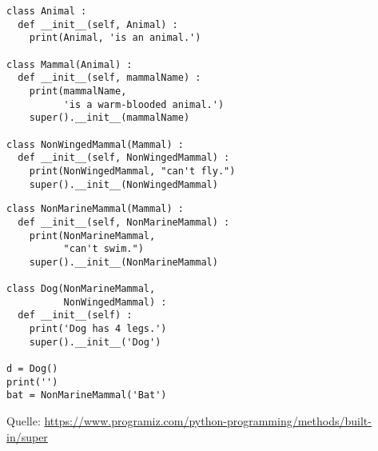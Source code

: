 \begin{frame}[fragile]
%
\begin{tcbraster}[raster columns=2,
                  raster equal height,
                  nobeforeafter,
                  raster column skip=0.5cm]
\begin{codebox}
\begin{verbatim}
class Animal :
  def __init__(self, Animal) :
    print(Animal, 'is an animal.')
    
class Mammal(Animal) :
  def __init__(self, mammalName) :
    print(mammalName, 
          'is a warm-blooded animal.')
    super().__init__(mammalName)

class NonWingedMammal(Mammal) :
  def __init__(self, NonWingedMammal) :
    print(NonWingedMammal, "can't fly.")
    super().__init__(NonWingedMammal)
\end{verbatim}
\end{codebox}
%
\begin{codebox}[... Fortsetzung]
\begin{verbatim}
class NonMarineMammal(Mammal) :
  def __init__(self, NonMarineMammal) :
    print(NonMarineMammal, 
          "can't swim.")
    super().__init__(NonMarineMammal)
    
class Dog(NonMarineMammal,
          NonWingedMammal) :
  def __init__(self) :
    print('Dog has 4 legs.')
    super().__init__('Dog')

d = Dog()
print('')
bat = NonMarineMammal('Bat')
\end{verbatim}
\end{codebox}
\end{tcbraster}
%
\begin{center}
	\scriptsize
	Quelle:
	\url{https://www.programiz.com/python-programming/methods/built-in/super}
\end{center}
%
\end{frame}



